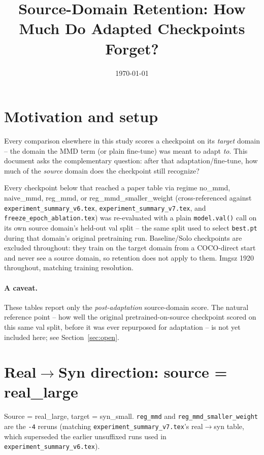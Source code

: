\documentclass[11pt]{article}
\title{Source-Domain Retention: How Much Do Adapted Checkpoints Forget?}
\author{}
\date{\today}
\begin{document}
\maketitle

\section{Motivation and setup}

Every comparison elsewhere in this study scores a checkpoint on its \emph{target}
domain -- the domain the MMD term (or plain fine-tune) was meant to adapt \emph{to}.
This document asks the complementary question: after that adaptation/fine-tune,
how much of the \emph{source} domain does the checkpoint still recognize?

Every checkpoint below that reached a paper table via regime no\_mmd, naive\_mmd,
reg\_mmd, or reg\_mmd\_smaller\_weight (cross-referenced against
\texttt{experiment\_summary\_v6.tex}, \texttt{experiment\_summary\_v7.tex}, and
\texttt{freeze\_epoch\_ablation.tex}) was re-evaluated with a plain \texttt{model.val()}
call on its own source domain's held-out val split -- the same split used to select
\texttt{best.pt} during that domain's original pretraining run. Baseline/Solo
checkpoints are excluded throughout: they train on the target domain from a
COCO-direct start and never see a source domain, so retention does not apply to them.
Imgsz 1920 throughout, matching training resolution.

\paragraph{A caveat.} These tables report only the \emph{post-adaptation} source-domain
score. The natural reference point -- how well the original pretrained-on-source
checkpoint scored on this same val split, before it was ever repurposed for
adaptation -- is not yet included here; see Section~\ref{sec:open}.

\section{Real$\to$Syn direction: source = real\_large}

Source = real\_large, target = syn\_small. \texttt{reg\_mmd} and
\texttt{reg\_mmd\_smaller\_weight} are the \texttt{-4} reruns (matching
\texttt{experiment\_summary\_v7.tex}'s real$\to$syn table, which superseded the
earlier unsuffixed runs used in \texttt{experiment\_summary\_v6.tex}).
\end{document}
